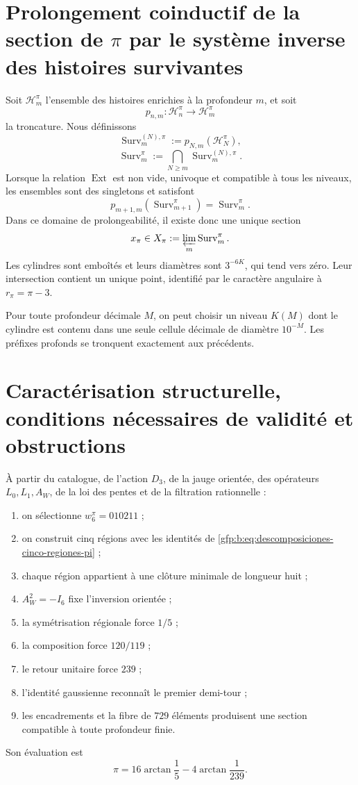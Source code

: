 \section{Prolongement coinductif de la section de \(\pi\) par le système inverse des histoires survivantes}

Soit \(\mathcal H_m^\pi\) l’ensemble des histoires enrichies à la profondeur
\(m\), et soit
\[
 p_{n,m}:\mathcal H_n^\pi\longrightarrow\mathcal H_m^\pi
\]
la troncature. Nous définissons
\[
 \operatorname{Surv}_m^{(N),\pi}
 :=p_{N,m}(\mathcal H_N^\pi),
\]
\[
 \operatorname{Surv}_m^\pi
 :=\bigcap_{N\geq m}\operatorname{Surv}_m^{(N),\pi}.
\]
Lorsque la relation \(\operatorname{Ext}\) est non vide, univoque et
compatible à tous les niveaux, les ensembles sont des singletons et satisfont
\[
 p_{m+1,m}(\operatorname{Surv}_{m+1}^{\pi})
 =\operatorname{Surv}_{m}^{\pi}.
\]
Dans ce domaine de prolongeabilité, il existe donc une unique section
\[
 x_\pi\in
 X_\pi:=\varprojlim_m\operatorname{Surv}_m^\pi.
\]
Les cylindres sont emboîtés et leurs diamètres sont \(3^{-6K}\), qui tend vers
zéro. Leur intersection contient un unique point, identifié par le caractère
angulaire à \(r_\pi=\pi-3\).

Pour toute profondeur décimale \(M\), on peut choisir un niveau \(K(M)\) dont le
cylindre est contenu dans une seule cellule décimale de diamètre \(10^{-M}\).
Les préfixes profonds se tronquent exactement aux précédents.

\section{Caractérisation structurelle, conditions nécessaires de validité et obstructions}

\begin{theorem}
\label{gfp:b:thm:caracterizacion-final-pi-autonoma}
À partir du catalogue, de l’action \(D_3\), de la jauge orientée, des
opérateurs \(L_0,L_1,A_W\), de la loi des pentes et de la filtration rationnelle :
\begin{enumerate}
 \item on sélectionne \(w_6^\pi=010211\) ;
 \item on construit cinq régions avec les identités de
       \eqref{gfp:b:eq:descomposiciones-cinco-regiones-pi} ;
 \item chaque région appartient à une clôture minimale de longueur huit ;
 \item \(A_W^2=-I_6\) fixe l’inversion orientée ;
 \item la symétrisation régionale force \(1/5\) ;
 \item la composition force \(120/119\) ;
 \item le retour unitaire force \(239\) ;
 \item l’identité gaussienne reconnaît le premier demi-tour ;
 \item les encadrements et la fibre de \(729\) éléments produisent une section
       compatible à toute profondeur finie.
\end{enumerate}
Son évaluation est
\[
 \boxed{\pi=16\arctan\frac15-4\arctan\frac1{239}.}
\]
\end{theorem}

